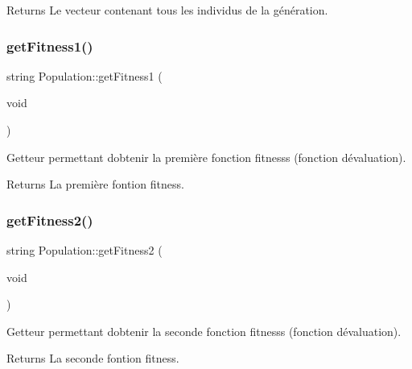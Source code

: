 \begin{DoxyReturn}{Returns}
Le vecteur contenant tous les individus de la génération. 
\end{DoxyReturn}
\mbox{\label{class_population_ae0fc085745b5611153c46e02e08fb367}} 
\subsubsection{\texorpdfstring{get\+Fitness1()}{getFitness1()}}
{\footnotesize\ttfamily string Population\+::get\+Fitness1 (\begin{DoxyParamCaption}\item[{void}]{ }\end{DoxyParamCaption})}



Getteur permettant d\textquotesingle{}obtenir la première fonction fitnesss (fonction d\textquotesingle{}évaluation). 

\begin{DoxyReturn}{Returns}
La première fontion fitness. 
\end{DoxyReturn}
\mbox{\label{class_population_a790aa479d01d5164ab47e107f7002287}} 
\subsubsection{\texorpdfstring{get\+Fitness2()}{getFitness2()}}
{\footnotesize\ttfamily string Population\+::get\+Fitness2 (\begin{DoxyParamCaption}\item[{void}]{ }\end{DoxyParamCaption})}



Getteur permettant d\textquotesingle{}obtenir la seconde fonction fitnesss (fonction d\textquotesingle{}évaluation). 

\begin{DoxyReturn}{Returns}
La seconde fontion fitness. 
\end{DoxyReturn}
\mbox{\label{class_population_aa55e37f348f9de0e3b2fe9a0de7d2bb3}} 
